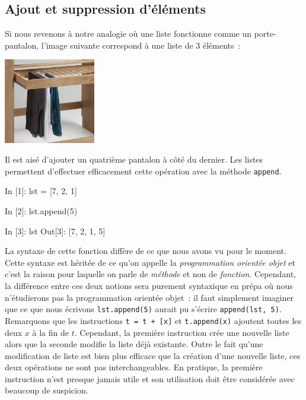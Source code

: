 \documentclass{magnoliaold}
\begin{document}
\subsection{Ajout et suppression d'éléments}

Si nous revenons à notre analogie où une liste fonctionne comme un porte-pantalon,
l'image suivante correspond à une liste de 3 éléments~:

\begin{center}
\includegraphics[width=0.3\textwidth]{../../commun/images/python-cours-jeans-tabdyn}
\end{center}
\noindent
Il est aisé d'ajouter un quatrième pantalon à côté du dernier. Les listes permettent
d'effectuer efficacement cette opération avec la méthode \verb!append!.

\begin{pythoncode}
In [1]: lst = [7, 2, 1]

In [2]: lst.append(5)

In [3]: lst
Out[3]: [7, 2, 1, 5]
\end{pythoncode}
\noindent
La syntaxe de cette fonction diffère de ce que nous avons vu pour le
moment. Cette syntaxe est héritée de ce qu'on appelle la \emph{programmation orientée objet} et c'est
la raison pour laquelle on parle de \emph{méthode} et non de \emph{fonction}. Cependant, la différence
entre ces deux notions sera purement syntaxique en prépa où nous n'étudierons pas la programmation
orientée objet~: il faut simplement imaginer que ce que nous écrivons \verb!lst.append(5)! aurait
pu s'écrire \verb!append(lst, 5)!.\\

Remarquons que les instructions \verb!t = t + [x]! et \verb!t.append(x)! ajoutent toutes les deux $x$ à la fin de 
$t$. Cependant, la première instruction crée une nouvelle liste alors que la seconde modifie la
liste déjà existante. Outre le fait qu'une modification de liste est bien plus efficace que la création
d'une nouvelle liste, ces deux opérations ne sont pas interchangeables.
En pratique, la première instruction n'est presque jamais utile et son utilisation doit être considérée avec
beaucoup de suspicion.\\
\end{document}
